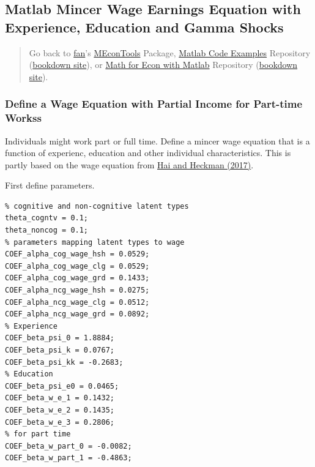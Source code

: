 \documentclass[
]{book}
\begin{document}
\hypertarget{matlab-mincer-wage-earnings-equation-with-experience-education-and-gamma-shocks}{%
\subsection{Matlab Mincer Wage Earnings Equation with Experience, Education and Gamma Shocks}\label{matlab-mincer-wage-earnings-equation-with-experience-education-and-gamma-shocks}}

\begin{quote}
Go back to \href{http://fanwangecon.github.io/}{fan}'s \href{https://fanwangecon.github.io/MEconTools/}{MEconTools} Package, \href{https://fanwangecon.github.io/M4Econ/}{Matlab Code Examples} Repository (\href{https://fanwangecon.github.io/M4Econ/bookdown}{bookdown site}), or \href{https://fanwangecon.github.io/Math4Econ/}{Math for Econ with Matlab} Repository (\href{https://fanwangecon.github.io/Math4Econ/bookdown}{bookdown site}).
\end{quote}

\hypertarget{define-a-wage-equation-with-partial-income-for-part-time-workss-1}{%
\subsubsection{Define a Wage Equation with Partial Income for Part-time Workss}\label{define-a-wage-equation-with-partial-income-for-part-time-workss-1}}

Individuals might work part or full time. Define a mincer wage equation
that is a function of experienc, education and other individual
characteristics. This is partly based on the wage equation from \href{https://www.sciencedirect.com/science/article/abs/pii/S1094202517300029}{Hai and
Heckman
(2017)}. \citep{HaiHeckman2017}

First define parameters.

\begin{verbatim}
% cognitive and non-cognitive latent types
theta_cogntv = 0.1;
theta_noncog = 0.1;
% parameters mapping latent types to wage
COEF_alpha_cog_wage_hsh = 0.0529;
COEF_alpha_cog_wage_clg = 0.0529;
COEF_alpha_cog_wage_grd = 0.1433;
COEF_alpha_ncg_wage_hsh = 0.0275;
COEF_alpha_ncg_wage_clg = 0.0512;
COEF_alpha_ncg_wage_grd = 0.0892;
% Experience
COEF_beta_psi_0 = 1.8884;
COEF_beta_psi_k = 0.0767;
COEF_beta_psi_kk = -0.2683;
% Education
COEF_beta_psi_e0 = 0.0465;
COEF_beta_w_e_1 = 0.1432;
COEF_beta_w_e_2 = 0.1435;
COEF_beta_w_e_3 = 0.2806;
% for part time
COEF_beta_w_part_0 = -0.0082;
COEF_beta_w_part_1 = -0.4863;
\end{verbatim}
\end{document}

